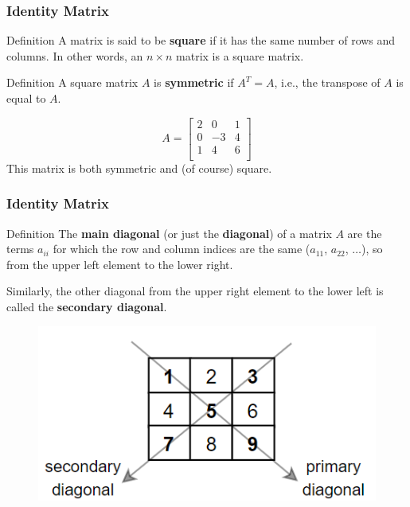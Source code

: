 \documentclass{beamer}
\begin{document}
\begin{frame}
  \frametitle{Identity Matrix}


  \begin{block}{Definition}
    A matrix is said to be \textbf{square} if it has the same number of rows and columns. In other words, an \(n \times n\) matrix is a square matrix.
  \end{block}

  \pause
  \begin{block}{Definition}
    A square matrix \(A\) is \textbf{symmetric} if \(A^T = A\), i.e., the transpose of \(A\) is equal to \(A\).
  \end{block}

  \pause


  \begin{example}
    \[
      A = \begin{bmatrix}
        2 & 0 & 1 \\
        0 & -3 & 4 \\
        1 & 4 & 6 \\
      \end{bmatrix}
    \]
    This matrix is both symmetric and (of course) square.
  \end{example}
\end{frame}
\begin{frame}
  \frametitle{Identity Matrix}


  \begin{block}{Definition}
    The \textbf{main diagonal} (or just the \textbf{diagonal}) of a matrix $A$ are the terms $a_{ii}$ for which the row and column indices are the same ($a_{11}$, $a_{22}$, $\dots$), so from the upper left element to the lower right.
  \end{block}

  \pause

  Similarly, the other diagonal from the upper right element to the lower left is called the \textbf{secondary diagonal}.

  \pause

  \begin{figure}
      \centering
      \includegraphics[width=0.5\linewidth]{twodiagonals.png}
      
      
  \end{figure}

\end{frame}
\end{document}
